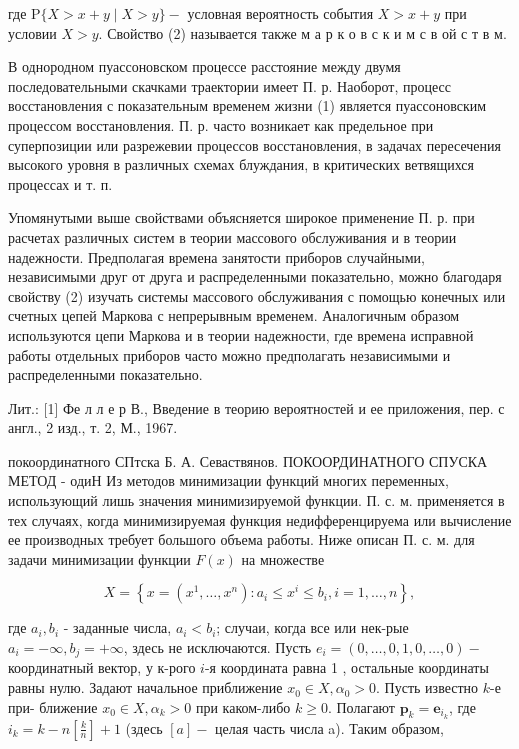 \documentclass[10pt]{article}
\begin{document}
где $\mathrm{P}\{X>x+y \mid X>y\}-$ условная вероятность события $X>x+y$ при условии $X>y$. Свойство (2) называется также м а р к о в с к и м с в ой с т в м.



В однородном пуассоновском процессе расстояние между двумя последовательными скачками траектории имеет П. р. Наоборот, процесс восстановления с показательным временем жизни (1) является пуассоновским процессом восстановления. П. р. часто возникает как предельное при суперпозиции или разрежевии процессов восстановления, в задачах пересечения высокого уровня в различных схемах блуждания, в критических ветвящихся процессах и т. п.



Упомянутыми выше свойствами объясняется широкое применение П. р. при расчетах различных систем в теории массового обслуживания и в теории надежности. Предполагая времена занятости приборов случайными, независимыми друг от друга и распределенными показательно, можно благодаря свойству (2) изучать системы массового обслуживания с помощью конечных или счетных цепей Маркова с непрерывным временем. Аналогичным образом используются цепи Маркова и в теории надежности, где времена исправной работы отдельных приборов часто можно предполагать независимыми и распределенными показательно.



Лит.: [1] Фе л л е р В., Введение в теорию вероятностей и ее приложения, пер. с англ., 2 изд., т. 2, М., 1967.



покоординатного СПтска Б. А. Севаствянов. ПОКООРДИНАТНОГО СПУСКА МЕТОД - одиН Из методов минимизации функций многих переменных, использующий лишь значения минимизируемой функции. П. с. м. применяется в тех случаях, когда минимизируемая функция недифференцируема или вычисление ее производных требует большого объема работы. Ниже описан П. с. м. для задачи минимизации функции $F(x)$ на множестве



\[

X=\left\{x=\left(x^{1}, \ldots, x^{n}\right): a_{i} \leqslant x^{i} \leqslant b_{i}, i=1, \ldots, n\right\},

\]



где $a_{i}, b_{i}$ - заданные числа, $a_{i}<b_{i}$; случаи, когда все или нек-рые $a_{i}=-\infty, b_{j}=+\infty$, здесь не исключаются. Пусть $e_{i}=(0, \ldots, 0,1,0, \ldots, 0)-$ координатный вектор, у к-рого $i$-я координата равна 1 , остальные координаты равны нулю. Задают начальное приближение $x_{0} \in X, \alpha_{0}>0$. Пусть известно $k$-е при- ближение $x_{0} \in X, \alpha_{k}>0$ при каком-либо $k \geqslant 0$. Полагают $\boldsymbol{p}_{k}=\boldsymbol{e}_{i_{k}}$, где $i_{k}=k-n\left[\frac{k}{n}\right]+1$ (здесь $[a]-$ целая часть числа a). Таким образом,
\end{document}
